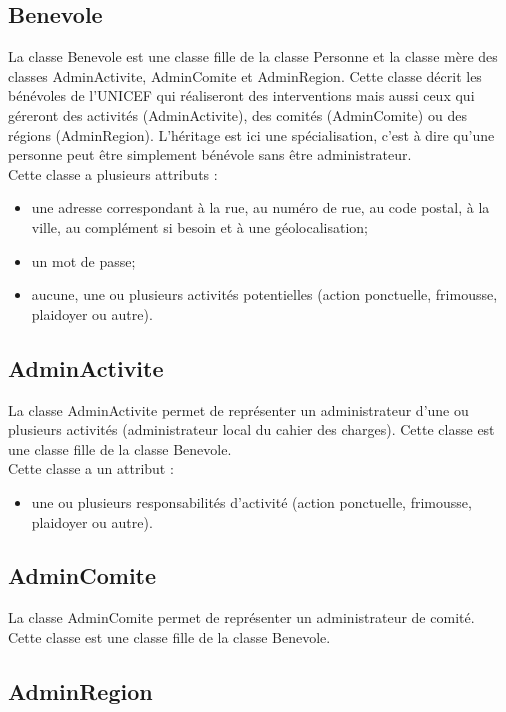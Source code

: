 \documentclass[asi, sansVersion]{picInsa}
\begin{document}
\subsection*{Benevole}

La classe Benevole est une classe fille de la classe Personne et la classe mère des classes AdminActivite, AdminComite et AdminRegion. Cette classe décrit les bénévoles de l'UNICEF qui réaliseront des interventions mais aussi ceux qui géreront des activités (AdminActivite), des comités (AdminComite) ou des régions (AdminRegion). L'héritage est ici une spécialisation, c'est à dire qu'une personne peut être simplement bénévole sans être administrateur. \\
Cette classe a plusieurs attributs : 
\begin{itemize}
\item une adresse correspondant à la rue, au numéro de rue, au code postal, à la ville, au complément si besoin et à une géolocalisation;
\item un mot de passe;
\item aucune, une ou plusieurs activités potentielles (action ponctuelle, frimousse, plaidoyer ou autre).
\end{itemize}

\subsection*{AdminActivite}

La classe AdminActivite permet de représenter un administrateur d'une ou plusieurs activités (administrateur local du cahier des charges). Cette classe est une classe fille de la classe Benevole.\\
Cette classe a un attribut :
\begin{itemize}
\item une ou plusieurs responsabilités d'activité (action ponctuelle, frimousse, plaidoyer ou autre). 
\end{itemize}

\subsection*{AdminComite}

La classe AdminComite permet de représenter un administrateur de comité. Cette classe est une classe fille de la classe Benevole. 

\subsection*{AdminRegion}
\end{document}

